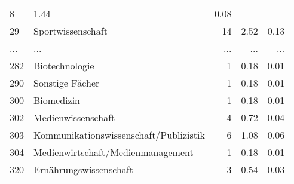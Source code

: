 \begin{longtable}{lXrrr}
          \num{8} &
          \num[round-mode=places,round-precision=2]{1.44} &
          \num[round-mode=places,round-precision=2]{0.08} \\
        29 & \multicolumn{1}{X}{Sportwissenschaft} & %
          \num{14} &
          \num[round-mode=places,round-precision=2]{2.52} &
          \num[round-mode=places,round-precision=2]{0.13} \\
       ... & ... & ... & ... & ... \\
        282 & \multicolumn{1}{X}{Biotechnologie} & %
          \num{1} &
          \num[round-mode=places,round-precision=2]{0.18} &
          \num[round-mode=places,round-precision=2]{0.01} \\

        290 & \multicolumn{1}{X}{Sonstige Fächer} & %
          \num{1} &
          \num[round-mode=places,round-precision=2]{0.18} &
          \num[round-mode=places,round-precision=2]{0.01} \\

        300 & \multicolumn{1}{X}{Biomedizin} & %
          \num{1} &
          \num[round-mode=places,round-precision=2]{0.18} &
          \num[round-mode=places,round-precision=2]{0.01} \\

        302 & \multicolumn{1}{X}{Medienwissenschaft} & %
          \num{4} &
          \num[round-mode=places,round-precision=2]{0.72} &
          \num[round-mode=places,round-precision=2]{0.04} \\

        303 & \multicolumn{1}{X}{Kommunikationswissenschaft/Publizistik} & %
          \num{6} &
          \num[round-mode=places,round-precision=2]{1.08} &
          \num[round-mode=places,round-precision=2]{0.06} \\

        304 & \multicolumn{1}{X}{Medienwirtschaft/Medienmanagement} & %
          \num{1} &
          \num[round-mode=places,round-precision=2]{0.18} &
          \num[round-mode=places,round-precision=2]{0.01} \\

        320 & \multicolumn{1}{X}{Ernährungswissenschaft} & %
          \num{3} &
          \num[round-mode=places,round-precision=2]{0.54} &
          \num[round-mode=places,round-precision=2]{0.03} \\


\end{longtable}

